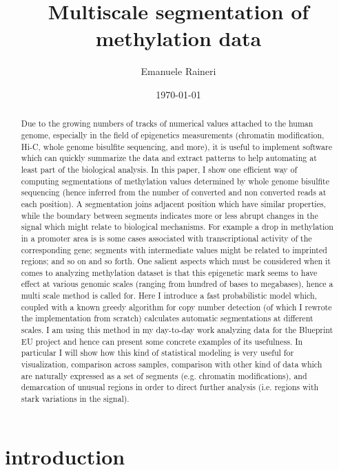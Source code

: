 \documentclass[11pt]{amsart}
\begin{document}
\title{Multiscale segmentation of methylation data}
\author{Emanuele Raineri}
\date{\today}
\maketitle

\begin{abstract}
Due to the growing numbers of tracks of numerical values attached to the 
human genome, especially in the field of epigenetics measurements 
(chromatin modification,
Hi-C, whole genome bisulfite sequencing, and more), 
it is useful to implement software 
which can quickly summarize the data and extract patterns to help 
automating at least  part of the biological analysis. 
In this paper, I show one efficient way of computing 
segmentations of methylation values determined by 
whole genome bisulfite sequencing
(hence inferred from the number of converted and non converted reads 
at each 
position).  
A segmentation joins adjacent position
which have similar properties, while the boundary between segments 
indicates 
more or less abrupt changes
in the signal which might relate to biological mechanisms. 
For example
a drop in methylation in a promoter area is is some cases associated with 
transcriptional activity of the corresponding gene; 
segments with intermediate values might be related to imprinted regions; 
and so on and so forth.
One salient aspects which must be considered when it comes to 
analyzing methylation dataset is that this epigenetic mark seems 
to have effect at various genomic scales 
(ranging from hundred of bases to megabases), hence a multi scale method 
is called for. 
Here I introduce a fast probabilistic model which, coupled with a known greedy 
algorithm for copy number detection 
(of which I rewrote the implementation from scratch) 
calculates automatic 
segmentations at different scales.
I am using this method in my day-to-day work analyzing data for the Blueprint 
EU project and hence can present 
some concrete examples of its usefulness. In particular I will show how this 
kind of statistical modeling is very useful for 
visualization, comparison across samples,
comparison with other kind of data which are naturally expressed as a set of 
segments (e.g. chromatin modifications),  and demarcation of unusual regions in 
order to direct further analysis (i.e. regions with stark variations in the signal).
\end{abstract}

\section{introduction}
\end{document}
